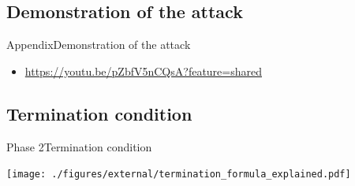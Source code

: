 \documentclass[aspectratio=169, hyperref={colorlinks=true, allcolors=SecondaryColor}, c]{beamer}
\begin{document}
  \subsection{Demonstration of the attack}

	\begin{frame}[fragile]{Appendix}{Demonstration of the attack}
    \begin{itemize}
      \item \url{https://youtu.be/pZbfV5nCQsA?feature=shared}
    \end{itemize}
	\end{frame}

  \subsection{Termination condition}

	\begin{frame}[fragile]{Phase 2}{Termination condition}
		\vspace{0.2cm}

		\texttt{[image: ./figures/external/termination\_formula\_explained.pdf]}
	\end{frame}
\end{document}
